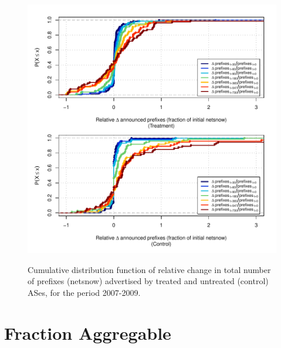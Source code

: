 \clearpage
\vspace*{16pt}
\begin{figure}[H]
\begin{centering}
\begin{singlespace}
\captionsetup{list=no}
    \includegraphics[width=6in]{figures/behavior-rel_netsnow-2007_2009-corr.pdf}
    \vspace{-2em}\\
    \caption{Cumulative distribution function of relative change in total
    number of prefixes (netsnow) advertised by treated and untreated (control)
    ASes, for the period 2007-2009.}
\end{singlespace}
\end{centering}
\end{figure}


\clearpage
\section{Fraction Aggregable}

